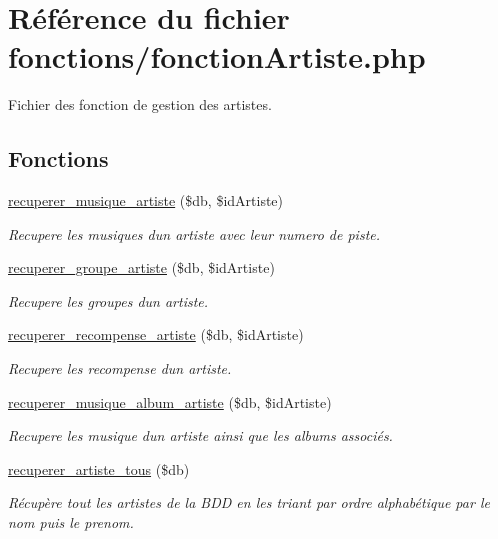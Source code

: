 \hypertarget{fonctionArtiste_8php}{}\section{Référence du fichier fonctions/fonction\+Artiste.php}
\label{fonctionArtiste_8php}


Fichier des fonction de gestion des artistes.  


\subsection*{Fonctions}
\begin{DoxyCompactItemize}
\item 
\hyperlink{fonctionArtiste_8php_a2b95a99d7c2dc74bec32f693024e103f}{recuperer\+\_\+musique\+\_\+artiste} (\$db, \$id\+Artiste)
\begin{DoxyCompactList}\small\item\em Recupere les musiques d\textquotesingle{}un artiste avec leur numero de piste. \end{DoxyCompactList}\item 
\hyperlink{fonctionArtiste_8php_a3316e178c4a16e77137d06da4f3678a6}{recuperer\+\_\+groupe\+\_\+artiste} (\$db, \$id\+Artiste)
\begin{DoxyCompactList}\small\item\em Recupere les groupes d\textquotesingle{}un artiste. \end{DoxyCompactList}\item 
\hyperlink{fonctionArtiste_8php_a9d9d26b5ff7bfe4275fb4a9f0d1e9c65}{recuperer\+\_\+recompense\+\_\+artiste} (\$db, \$id\+Artiste)
\begin{DoxyCompactList}\small\item\em Recupere les recompense d\textquotesingle{}un artiste. \end{DoxyCompactList}\item 
\hyperlink{fonctionArtiste_8php_a832fa57d647e7f45e0b04178dc0fd91c}{recuperer\+\_\+musique\+\_\+album\+\_\+artiste} (\$db, \$id\+Artiste)
\begin{DoxyCompactList}\small\item\em Recupere les musique d\textquotesingle{}un artiste ainsi que les albums associés. \end{DoxyCompactList}\item 
\hyperlink{fonctionArtiste_8php_a47f7a10f228b07d60d2282929007bd5d}{recuperer\+\_\+artiste\+\_\+tous} (\$db)
\begin{DoxyCompactList}\small\item\em Récupère tout les artistes de la B\+DD en les triant par ordre alphabétique par le nom puis le prenom. \end{DoxyCompactList}\item 

\end{DoxyCompactItemize}
